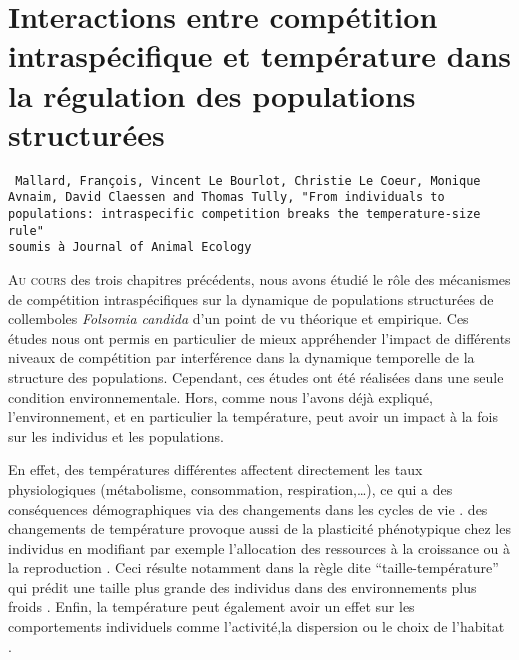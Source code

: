 \chapter{Interactions entre compétition intraspécifique et température dans la
régulation des populations structurées}
\label{chap:fip}

\vspace{2cm}
\begin{Spacing}{1}
\texttt{
Mallard, François, Vincent Le Bourlot, Christie Le Coeur, Monique Avnaim, David
Claessen and Thomas Tully, "From individuals to populations: intraspecific
competition breaks the temperature-size rule"\\
soumis à Journal of Animal Ecology}
\end{Spacing}
\vspace{2cm}


\lettrine[lines=3]{A}{u cours} des trois chapitres précédents, nous avons étudié
le rôle des mécanismes de compétition intraspécifiques sur la dynamique de
populations structurées de collemboles \textit{Folsomia candida} d'un point de vu théorique
et empirique. Ces études nous ont permis en particulier de mieux appréhender
l'impact de différents niveaux de compétition par interférence dans la
dynamique temporelle de la structure des populations. Cependant, ces études ont
été réalisées dans une seule condition environnementale. Hors, comme nous
l'avons déjà expliqué, l'environnement, et en particulier la température, peut
avoir un impact à la fois sur les individus et les populations. 

En effet, des températures différentes affectent directement les taux
physiologiques (métabolisme, consommation, respiration,\ldots), ce qui a des
conséquences démographiques via des changements dans les cycles de vie
\autocites{gillooly2002a,le-galliard2012a}. des changements de température
provoque aussi de la plasticité phénotypique chez les individus en modifiant par
exemple l'allocation des ressources à la croissance ou à la reproduction
\autocites{liefting2010temperature,gutteling2007mapping}. Ceci résulte notamment
dans la règle dite ``taille-température'' qui prédit une taille plus grande des
individus dans des environnements plus froids
\autocites{atkinson1994a,atkinson1996a,angilletta2009a}. Enfin, la température
peut également avoir un effet sur les comportements individuels comme
l'activité,la dispersion ou le choix de l'habitat
\autocites{atacho2013a,bonte2008thermal,vanbeest2012temperature}.

